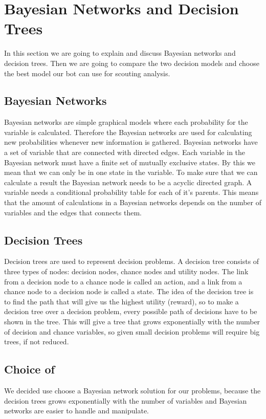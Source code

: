 \section{Bayesian Networks and Decision Trees}
In this section we are going to explain and discuss Bayesian networks and decision trees. Then we are going to compare the two decision models and choose the best model our bot can use for scouting analysis.

\subsection{Bayesian Networks}
	Bayesian networks are simple graphical models where each probability for the variable is calculated. Therefore the Bayesian networks are used for calculating new probabilities whenever new information is gathered. Bayesian networks have a  set of variable that are connected with directed edges. Each variable in the Bayesian network must have a finite set of mutually exclusive states. By this we mean that we can only be in one state in the variable. To make sure that we can calculate a result the Bayesian network needs to be a acyclic directed graph. A variable needs a conditional probability table for each of it's parents. This means that the amount of calculations in a Bayesian networks depends on the number of variables and the edges that connects them.

\subsection{Decision Trees}
Decision trees are used to represent decision problems. A decision tree consists of three types of nodes: decision nodes, chance nodes and utility nodes. The link from a decision node to a chance node is called an action, and a link from a chance node to a decision node is called a state. The idea of the decision tree is to find the path that will give us the highest utility (reward), so to make a decision tree over a decision problem, every possible path of decisions have to be shown in the tree. This will give a tree that grows exponentially with the number of decision and chance variables, so given small decision problems will require big trees, if not reduced. 
		
\subsection{Choice of }
We decided use choose a Bayesian network solution for our problems, because the decision trees grows exponentially with the number of variables and 
Bayesian networks are easier to handle and manipulate.